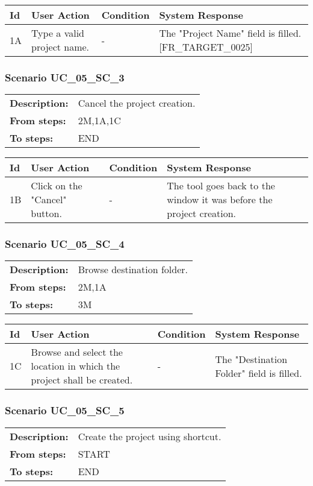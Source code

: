 \documentclass[a4paper,11pt]{article}
\newcommand{\bl}{\\ \hline}
\begin{document}
\begin{tabular}{|p{0.8in}|p{1.6in}|p{1.6in}|p{1.6in}|}
\hline
Id & User Action & Condition & System Response  \bl 
1A & Type a valid project name. & - & The "Project Name" field is filled. [FR_TARGET_0025] \bl 
\end{tabular}
\subsubsection*{Scenario UC_05_SC_3}
\begin{tabular}{p{1in}p{4in}}
{\bf Description:} & Cancel the project creation. \\
{\bf From steps:} & 2M,1A,1C \\
{\bf To steps:} & END \\
\end{tabular}
 
\begin{tabular}{|p{0.8in}|p{1.6in}|p{1.6in}|p{1.6in}|}
\hline
Id & User Action & Condition & System Response  \bl 
1B & Click on the "Cancel" button. & - & The tool goes back to the window it was before the project creation. \bl 
\end{tabular}
\subsubsection*{Scenario UC_05_SC_4}
\begin{tabular}{p{1in}p{4in}}
{\bf Description:} & Browse destination folder. \\
{\bf From steps:} & 2M,1A \\
{\bf To steps:} & 3M \\
\end{tabular}
 
\begin{tabular}{|p{0.8in}|p{1.6in}|p{1.6in}|p{1.6in}|}
\hline
Id & User Action & Condition & System Response  \bl 
1C & Browse and select the location in which the project shall be created. & - & The "Destination Folder" field is filled. \bl 
\end{tabular}
\subsubsection*{Scenario UC_05_SC_5}
\begin{tabular}{p{1in}p{4in}}
{\bf Description:} & Create the project using shortcut. \\
{\bf From steps:} & START \\
{\bf To steps:} & END \\
\end{tabular}
 
\end{document}
